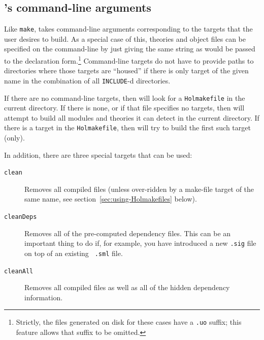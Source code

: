 \subsection{\holmake{}'s command-line arguments}
Like {\tt make}, \holmake{} takes command-line arguments corresponding to the targets that the user desires to build.
As a special case of this, theories and \ML{} object files can be specified on the command-line by just giving the same string as would be passed to the  declaration form.\footnote{Strictly, the files generated on disk for these cases have a \texttt{.uo} suffix; this feature allows that suffix to be omitted.}
Command-line targets do not have to provide paths to directories where those targets are ``housed'' if there is only target of the given name in the combination of all \texttt{INCLUDE}-d directories.

If there are no command-line targets, then \holmake{} will look for a \texttt{Holmakefile} in the current directory.
If there is none, or if that file specifies no targets, then \holmake{} will attempt to build all \ML{} modules and \HOL{} theories it can detect in the current directory.
If there is a target in the \texttt{Holmakefile}, then \holmake{} will try to build the first such target (only).

In addition, there are three special targets that can be used:
\begin{description}
\item[{\tt clean}] Removes all compiled files (unless over-ridden by a
  make-file target of the same name, see
  section~\ref{sec:using-Holmakefiles} below).
\item [{\tt cleanDeps}] Removes all of the pre-computed dependency
  files.  This can be an important thing to do if, for example, you
  have introduced a new {\tt .sig} file on top of an existing {\tt
    .sml} file.
\item [{\tt cleanAll}] Removes all compiled files as well as all of
  the hidden dependency information.
\end{description}

